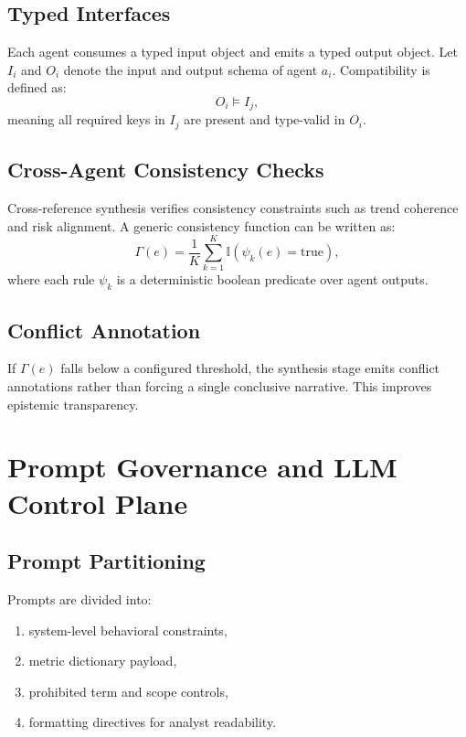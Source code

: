 \documentclass[conference]{IEEEtran}
\begin{document}
\subsection{Typed Interfaces}
Each agent consumes a typed input object and emits a typed output object. Let $I_i$ and $O_i$ denote the input and output schema of agent $a_i$. Compatibility is defined as:
\begin{equation}
O_i \models I_j,
\end{equation}
meaning all required keys in $I_j$ are present and type-valid in $O_i$.

\subsection{Cross-Agent Consistency Checks}
Cross-reference synthesis verifies consistency constraints such as trend coherence and risk alignment. A generic consistency function can be written as:
\begin{equation}
\Gamma(e)=\frac{1}{K}\sum_{k=1}^{K}\mathbb{I}(\psi_k(e)=\text{true}),
\end{equation}
where each rule $\psi_k$ is a deterministic boolean predicate over agent outputs.

\subsection{Conflict Annotation}
If $\Gamma(e)$ falls below a configured threshold, the synthesis stage emits conflict annotations rather than forcing a single conclusive narrative. This improves epistemic transparency.

\section{Prompt Governance and LLM Control Plane}
\subsection{Prompt Partitioning}
Prompts are divided into:
\begin{enumerate}
    \item system-level behavioral constraints,
    \item metric dictionary payload,
    \item prohibited term and scope controls,
    \item formatting directives for analyst readability.
\end{enumerate}
\end{document}
